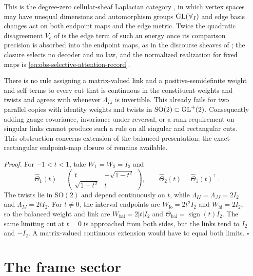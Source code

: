 This is the degree-zero cellular-sheaf Laplacian category \citep{HansenGhrist2019}, in which vertex spaces
may have unequal dimensions and automorphism groups $\mathrm{GL}(\mathbb V_I)$ and edge basis changes act on both endpoint
maps and the edge metric. Twice the quadratic disagreement $V_e$ of  is
the edge term of such an energy once its comparison precision is absorbed into the endpoint maps, as in
the discourse sheaves of \citet{HansenGhrist2021Discourse}; the closure selects no decoder and no law, and
the normalized realization for fixed maps is \eqref{eq:obs-selective-attention-record}.

There is no rule assigning a matrix-valued link and a positive-semidefinite weight and self terms to
every cut that is continuous in the constituent weights and twists and agrees with
 whenever $\Lambda_{IJ}$ is invertible. This already fails for two
parallel copies with identity weights and twists in $\mathrm{SO}(2)\subset\mathrm{GL}^+(2)$. Consequently adding
gauge covariance, invariance under reversal, or a rank requirement on singular links cannot produce such
a rule on all singular and rectangular cuts. This obstruction concerns extension of the balanced
presentation; the exact rectangular endpoint-map closure of 
remains available. 

\noindent\emph{Proof.}
For $-1<t<1$, take $W_1=W_2=I_2$ and
\begin{equation}
\widehat\Theta_1(t)=\begin{pmatrix}t&-\sqrt{1-t^2}\\\sqrt{1-t^2}&t\end{pmatrix},
\qquad \widehat\Theta_2(t)=\widehat\Theta_1(t)^\top.
\label{eq:cg-cut-continuous-extension-witness}
\end{equation}
The twists lie in $\mathrm{SO}(2)$ and depend continuously on $t$, while
$\Lambda_{II}=\Lambda_{JJ}=2I_2$ and $\Lambda_{IJ}=2tI_2$. For $t\neq0$, the interval endpoints are
$W_{\mathrm{lo}}=2t^2I_2$ and $W_{\mathrm{hi}}=2I_2$, so the balanced weight and link are
$W_{\mathrm{bal}}=2|t|I_2$ and $\Theta_{\mathrm{bal}}=\operatorname{sign}(t)I_2$.
The same limiting cut at $t=0$ is approached from both sides, but the links tend to $I_2$ and $-I_2$.
A matrix-valued continuous extension would have to equal both limits. $\square$

\section{The frame sector}
\label{sec:cg-frame}

